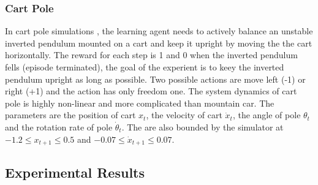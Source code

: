 \documentclass[conference]{IEEEtran}
\begin{document}
\subsubsection{Cart Pole}
In cart pole simulations \cite{sutton1998reinforcement}, the learning agent needs to actively balance an unstable inverted pendulum mounted on a cart and keep it upright by moving the the cart horizontally. The reward for each step is 1 and 0 when the inverted pendulum fells (episode terminated), the goal of the experient is to keey the inverted pendulum upright as long as possible. Two possible actions are move left (-1) or right (+1) and the action has only freedom one. The system dynamics of cart pole is highly non-linear and more complicated than mountain car. The parameters are the position of cart $x_t$, the velocity of cart $\dot{x}_t$, the angle of pole $\theta_t$ and the rotation rate of pole $\dot{\theta}_t$. The are also bounded by the simulator at $-1.2 \leq x_{t+1} \leq 0.5$ and $-0.07 \leq \dot{x}_{t+1} \leq0.07$.
\subsection{Experimental Results}
\end{document}
